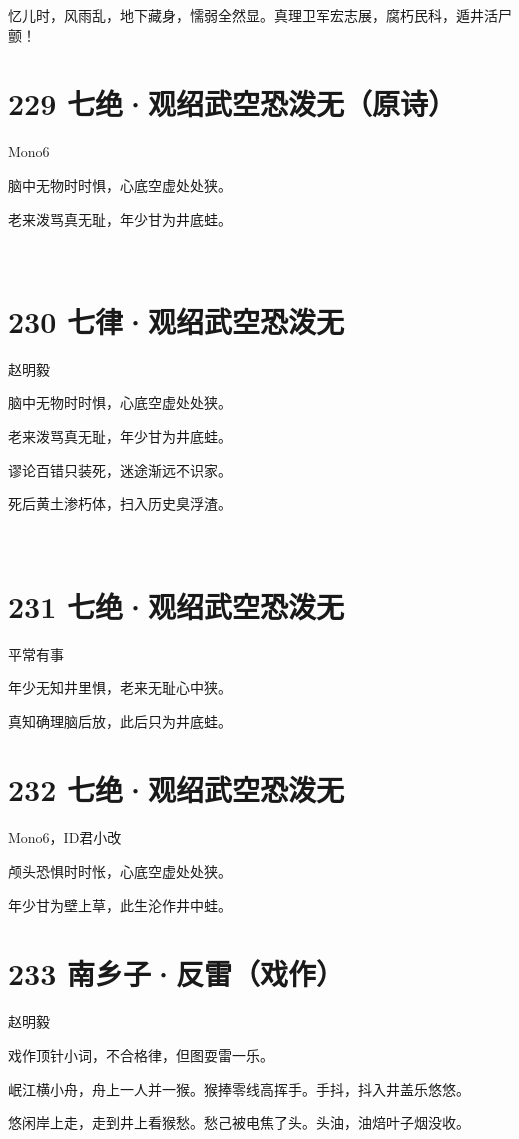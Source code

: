 \documentclass[UTF8,12pt,oneside]{ctexbook}
\def\pau#1{\begin{center} {#1} \end{center}} %
\def\poem#1#2{\section{#1}\pau{#2}} %
\begin{document}
        忆儿时，风雨乱，地下藏身，懦弱全然显。真理卫军宏志展，腐朽民科，遁井活尸颤！

        \poem{229 七绝·观绍武空恐泼无（原诗）}{Mono6}
        \begin{center}
        脑中无物时时惧，心底空虚处处狭。
        
        老来泼骂真无耻，年少甘为井底蛙。

        ~\\
        \end{center}

        \poem{230 七律·观绍武空恐泼无}{赵明毅}
        \begin{center}
        脑中无物时时惧，心底空虚处处狭。
        
        老来泼骂真无耻，年少甘为井底蛙。
        
        谬论百错只装死，迷途渐远不识家。
        
        死后黄土渗朽体，扫入历史臭浮渣。

        ~\\
        \end{center}

        \poem{231 七绝·观绍武空恐泼无}{平常有事}
        \begin{center}
        年少无知井里惧，老来无耻心中狭。
        
        真知确理脑后放，此后只为井底蛙。
        \end{center}

        \newpage

        \poem{232 七绝·观绍武空恐泼无}{Mono6，ID君小改}
        \begin{center}
        颅头恐惧时时怅，心底空虚处处狭。
        
        年少甘为壁上草，此生沦作井中蛙。
        \end{center}

        \poem{233 南乡子·反雷（戏作）}{赵明毅}
        
        \kaishu
        戏作顶针小词，不合格律，但图耍雷一乐。
        
        \songti
        岷江横小舟，舟上一人并一猴。猴捧零线高挥手。手抖，抖入井盖乐悠悠。
        
        悠闲岸上走，走到井上看猴愁。愁己被电焦了头。头油，油焙叶子烟没收。
\end{document}

